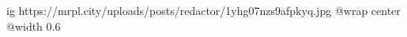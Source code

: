  
 
 
 
 

\ifcmt
  ig https://mrpl.city/uploads/posts/redactor/1yhg07nzs9afpkyq.jpg
  @wrap center
  @width 0.6
\fi
